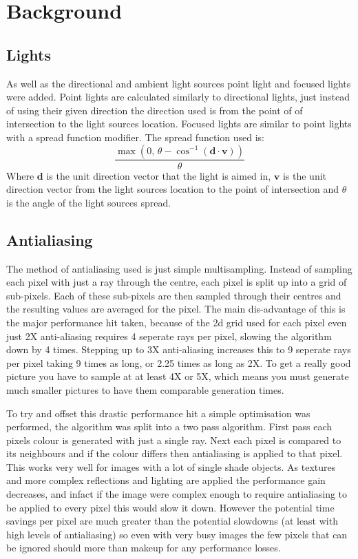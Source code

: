 \section{Background}
  \subsection{Lights}
    As well as the directional and ambient light sources point light and focused
    lights were added.  Point lights are calculated similarly to directional
    lights, just instead of using their given direction the direction used is
    from the point of of intersection to the light sources location.  Focused
    lights are similar to point lights with a spread function modifier.  The
    spread function used is:
    \[ \frac{\max\left(0,\, \theta - \cos^{-1}\left( \mathbf{d} \cdot
    \mathbf{v}\right)\right)}{\theta} \]
    Where $\mathbf{d}$ is the unit direction vector that the light is aimed in,
    $\mathbf{v}$ is the unit direction vector from the light sources location to
    the point of intersection and $\theta$ is the angle of the light sources
    spread.

  \subsection{Antialiasing}
    The method of antialiasing used is just simple multisampling.  Instead of
    sampling each pixel with just a ray through the centre, each pixel is split
    up into a grid of sub-pixels.  Each of these sub-pixels are then sampled
    through their centres and the resulting values are averaged for the pixel.
    The main dis-advantage of this is the major performance hit taken, because
    of the 2d grid used for each pixel even just 2X anti-aliasing requires 4
    seperate rays per pixel, slowing the algorithm down by 4 times.  Stepping up
    to 3X anti-aliasing increases this to 9 seperate rays per pixel taking 9
    times as long, or 2.25 times as long as 2X.  To get a really good picture
    you have to sample at at least 4X or 5X, which means you must generate much
    smaller pictures to have them comparable generation times.

    To try and offset this drastic performance hit a simple optimisation was
    performed, the algorithm was split into a two pass algorithm.  First pass
    each pixels colour is generated with just a single ray.  Next each pixel is
    compared to its neighbours and if the colour differs then antialiasing is
    applied to that pixel.  This works very well for images with a lot of single
    shade objects.  As textures and more complex reflections and lighting are
    applied the performance gain decreases, and infact if the image were complex
    enough to require antialiasing to be applied to every pixel this would slow
    it down.  However the potential time savings per pixel are much greater than
    the potential slowdowns (at least with high levels of antialiasing) so even
    with very busy images the few pixels that can be ignored should more than
    makeup for any performance losses.


